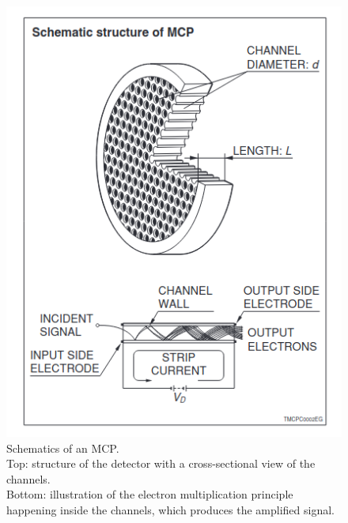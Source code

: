 

\begin{figure}
\begin{minipage}[c]{.45\linewidth}
    \includegraphics[width=1\linewidth]{Images/TestBeam_setup/MCP diagram HAMAMATSU.png}
\end{minipage}
\hfill
\begin{minipage}[c]{.5\linewidth}
    \caption{
    Schematics of an MCP.\\ 
    Top: structure of the detector with a cross-sectional view of the channels.\\
    Bottom: illustration of the electron multiplication principle happening inside the channels, which produces the amplified signal.}
\end{minipage}
\label{fig:MCP_diagrame}
\end{figure}


